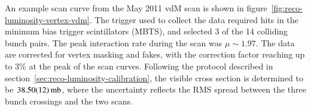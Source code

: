 An example scan curve from the May 2011 vdM scan is shown in figure~\ref{fig:reco-luminosity-vertex-vdm}. The trigger used to collect the data required hits in the minimum bias trigger scintillators (MBTS), and selected 3 of the 14 colliding bunch pairs. The peak interaction rate during the scan was $\mu\sim1.97$. The data are corrected for vertex masking and fakes, with the correction factor reaching up to 3\% at the peak of the scan curves. Following the protocol described in section~\ref{sec:reco-luminosity-calibration}, the visible cross section is determined to be $\SI{38.5\pm 0.12}{\milli\barn}$, where the uncertainty reflects the RMS spread between the three bunch crossings and the two scans.

\begin{figure}[p]
	\centering
\end{figure}
